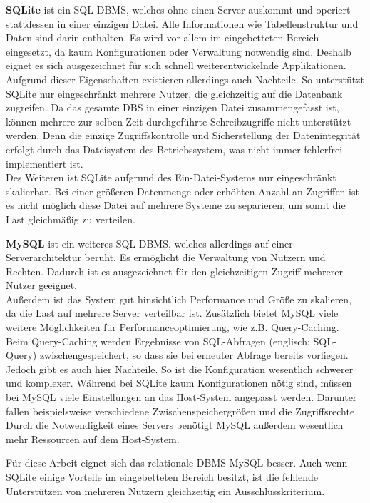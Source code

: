 \textbf{SQLite} ist ein \ac{SQL} \ac{DBMS}, welches ohne einen Server auskommt und operiert stattdessen in einer einzigen Datei. Alle Informationen wie Tabellenstruktur und Daten sind darin enthalten. Es wird vor allem im eingebetteten Bereich eingesetzt, da kaum Konfigurationen oder Verwaltung notwendig sind. Deshalb eignet es sich ausgezeichnet für sich schnell weiterentwickelnde Applikationen.
\\
Aufgrund dieser Eigenschaften existieren allerdings auch Nachteile. So unterstützt SQLite nur eingeschränkt mehrere Nutzer, die gleichzeitig auf die Datenbank zugreifen. Da das gesamte \ac{DBS} in einer einzigen Datei zusammengefasst ist, können mehrere zur selben Zeit durchgeführte Schreibzugriffe nicht unterstützt werden. Denn die einzige Zugriffskontrolle und Sicherstellung der Datenintegrität erfolgt durch das Dateisystem des Betriebssystem, was nicht immer fehlerfrei implementiert ist.
\\
Des Weiteren ist SQLite aufgrund des Ein-Datei-Systems nur eingeschränkt skalierbar. Bei einer größeren Datenmenge oder erhöhten Anzahl an Zugriffen ist es nicht möglich diese Datei auf mehrere Systeme zu separieren, um somit die Last gleichmäßig zu verteilen.

\textbf{MySQL} ist ein weiteres \ac{SQL} \ac{DBMS}, welches allerdings auf einer Serverarchitektur beruht. 
Es ermöglicht die Verwaltung von Nutzern und Rechten. Dadurch ist es ausgezeichnet für den gleichzeitigen Zugriff mehrerer Nutzer geeignet.\\ Außerdem ist das System gut hinsichtlich Performance und Größe zu skalieren, da die Last auf mehrere Server verteilbar ist. Zusätzlich bietet MySQL viele weitere Möglichkeiten für Performanceoptimierung, wie z.B. Query-Caching. Beim Query-Caching werden Ergebnisse von SQL-Abfragen (englisch: SQL-Query) zwischengespeichert, so dass sie bei erneuter Abfrage bereits vorliegen.
\\
Jedoch gibt es auch hier Nachteile. So ist die Konfiguration wesentlich schwerer und komplexer. Während bei SQLite kaum Konfigurationen nötig sind, müssen bei MySQL viele Einstellungen an das Host-System angepasst werden. Darunter fallen beispielsweise verschiedene Zwischenspeichergrößen und die Zugriffsrechte. Durch die Notwendigkeit eines Servers benötigt MySQL außerdem wesentlich mehr Ressourcen auf dem Host-System.

Für diese Arbeit eignet sich das relationale \ac{DBMS} MySQL besser. Auch wenn SQLite einige Vorteile im eingebetteten Bereich besitzt, ist die fehlende Unterstützen von mehreren Nutzern gleichzeitig ein Ausschlusskriterium.

